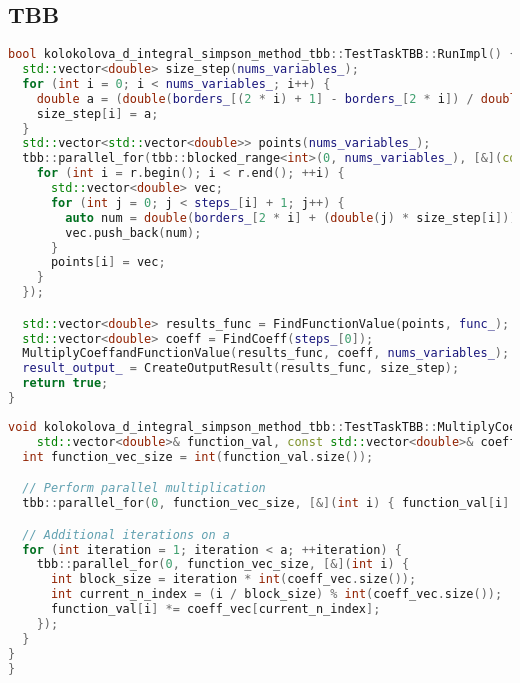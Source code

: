 \documentclass[12pt]{article}
\begin{document}
\subsection*{TBB}
\begin{lstlisting}[language=C++]
bool kolokolova_d_integral_simpson_method_tbb::TestTaskTBB::RunImpl() {
  std::vector<double> size_step(nums_variables_);
  for (int i = 0; i < nums_variables_; i++) {
    double a = (double(borders_[(2 * i) + 1] - borders_[2 * i]) / double(steps_[i]));
    size_step[i] = a;
  }
  std::vector<std::vector<double>> points(nums_variables_);
  tbb::parallel_for(tbb::blocked_range<int>(0, nums_variables_), [&](const tbb::blocked_range<int>& r) {
    for (int i = r.begin(); i < r.end(); ++i) {
      std::vector<double> vec;
      for (int j = 0; j < steps_[i] + 1; j++) {
        auto num = double(borders_[2 * i] + (double(j) * size_step[i]));
        vec.push_back(num);
      }
      points[i] = vec;
    }
  });

  std::vector<double> results_func = FindFunctionValue(points, func_);
  std::vector<double> coeff = FindCoeff(steps_[0]);
  MultiplyCoeffandFunctionValue(results_func, coeff, nums_variables_);
  result_output_ = CreateOutputResult(results_func, size_step);
  return true;
}
\end{lstlisting}
\begin{lstlisting}[language=C++]
void kolokolova_d_integral_simpson_method_tbb::TestTaskTBB::MultiplyCoeffandFunctionValue(
    std::vector<double>& function_val, const std::vector<double>& coeff_vec, int a) {
  int function_vec_size = int(function_val.size());

  // Perform parallel multiplication
  tbb::parallel_for(0, function_vec_size, [&](int i) { function_val[i] *= coeff_vec[i % coeff_vec.size()]; });

  // Additional iterations on a
  for (int iteration = 1; iteration < a; ++iteration) {
    tbb::parallel_for(0, function_vec_size, [&](int i) {
      int block_size = iteration * int(coeff_vec.size());
      int current_n_index = (i / block_size) % int(coeff_vec.size());
      function_val[i] *= coeff_vec[current_n_index];
    });
  }
}
}
\end{lstlisting}
\newpage
\end{document}
